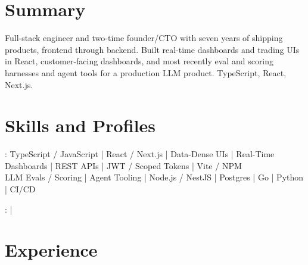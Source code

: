 \documentclass[print]{jack-resume}
\begin{document}
\pagecolor{darkmodeBackground}


\begin{minipage}[t][1cm][t]{.03\textwidth}
    \hfill
\end{minipage}

\section{Summary}
Full-stack engineer and two-time founder/CTO with seven years of shipping products, frontend through backend. Built real-time dashboards and trading UIs in React, customer-facing dashboards, and most recently eval and scoring harnesses and agent tools for a production LLM product. TypeScript, React, Next.js.
\sectionsep

\section{Skills and Profiles}
:
TypeScript / JavaScript \hfill | \hfill
React / Next.js \hfill | \hfill
Data-Dense UIs \hfill | \hfill
Real-Time Dashboards \hfill | \hfill
REST APIs \hfill | \hfill
JWT / Scoped Tokens \hfill | \hfill
Vite / NPM \\
\hspace{1.0cm} LLM Evals / Scoring \hfill | \hfill
Agent Tooling \hfill | \hfill
Node.js / NestJS \hfill | \hfill
Postgres \hfill | \hfill
Go \hfill | \hfill
Python \hfill | \hfill
CI/CD \\

\raggedright{
    :
      \href{https://www.linkedin.com/in/jack-sturtevant/}{ \ExternalLink} |
     \href{https://github.com/jacksturt}{ \ExternalLink}}

\section{Experience}
\end{document}
